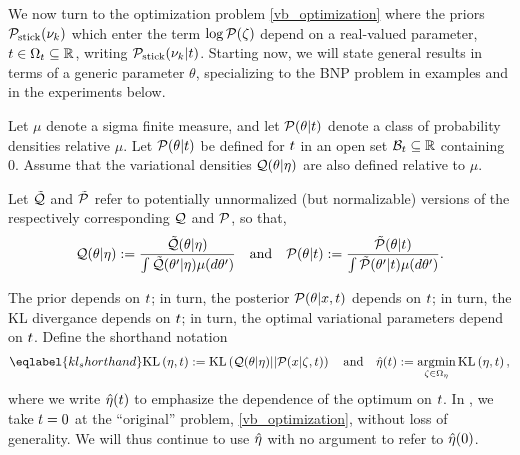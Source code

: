 We now turn to the optimization problem \eqref{vb_optimization} where the priors
$\mathcal{P}_{\mathrm{stick}}(\nu_{k})$ which enter the term $\log \mathcal{P}(\zeta)$ depend on a real-valued
parameter, $t \in \Omega_{t} \subseteq \mathbb{R}$, writing $\mathcal{P}_{\mathrm{stick}}(\nu_{k} \vert
t)$.  Starting now, we will state general results in terms of a generic
parameter $\theta$, specializing to the BNP problem in examples and in the
experiments below.

%

\begin{defn}
%
Let $\mu$ denote a sigma finite measure, and let $\mathcal{P}(\theta \vert t)$ denote a
class of probability densities relative $\mu$.  Let $\mathcal{P}(\theta \vert t)$ be
defined for $t$ in an open set $\mathcal{B}_t \subseteq \mathbb{R}$ containing $0$.
Assume that the variational densities $\mathcal{Q}(\theta \vert \eta)$ are also defined
relative to $\mu$.

Let $\tilde{\mathcal{Q}}$ and $\tilde{\mathcal{P}}$ refer to potentially
unnormalized (but normalizable) versions of the respectively corresponding $\mathcal{Q}$
and $\mathcal{P}$, so that,
%
\begin{align*}
%
\q(\theta \vert \eta) :={}
    \frac{\qtil(\theta \vert \eta)}
    {\int \qtil(\theta' \vert \eta) \mu(d\theta')} \mathand
\p(\theta \vert \t) :={}
    \frac{\ptil(\theta \vert \t)}
    {\int \ptil(\theta' \vert \t) \mu(d\theta')}.
%
\end{align*}
%
\end{defn}

The prior depends on $t$; in turn, the posterior $\mathcal{P}(\theta \vert x, t)$
depends on $t$; in turn, the KL divergance depends on $t$; in turn, the
optimal variational parameters depend on $t$.  Define the shorthand notation
%
\begin{align}\eqlabel{kl_shorthand}
%
\KL{\eta, \t} := \KL{\q(\theta \vert \eta) || \p(\x \vert \zeta, \t)}
\mathand
\etaopt(\t) := \argmin_{\zeta \in \etadom} \KL{\eta, \t},
%
\end{align}
%
where we write $\hat\eta(t)$ to emphasize the dependence of the optimum on $t$.
In , we take $t = 0$ at the ``original'' problem,
\eqref{vb_optimization}, without loss of generality.  We will thus continue to
use $\hat\eta$ with no argument to refer to $\hat\eta(0)$.


